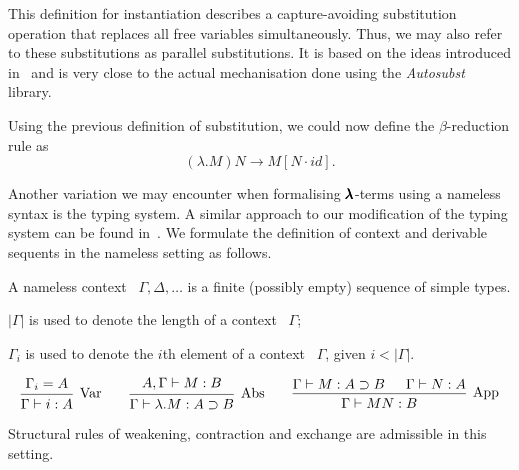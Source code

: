 This definition for instantiation describes a capture-avoiding substitution operation that replaces all free variables simultaneously.
Thus, we may also refer to these substitutions as parallel substitutions.
It is based on the ideas introduced in~\cite{AutosubstSchafer} and is very close to the actual mechanisation done using the \textit{Autosubst} library.

Using the previous definition of substitution, we could now define the $\beta$-reduction rule as
\[ (\lambda . M) N \to M[N \cdot id]. \]

Another variation we may encounter when formalising $\pmb{\lambda}$-terms using a nameless syntax is the typing system.
A similar approach to our modification of the typing system can be found in~\cite[Chapter~7]{AndrewAdams}.
We formulate the definition of context and derivable sequents in the nameless setting as follows.

\begin{definition}
  A nameless context \ $\Gamma, \Delta, \dots$ is a finite (possibly empty) sequence of simple types.
\end{definition}

\begin{notation} \hfill
  
  $| \Gamma |$ is used to denote the length of a context \ $\Gamma$;

  $\Gamma_i$ is used to denote the $i$th element of a context \ $\Gamma$, given $i < | \Gamma |$.
\end{notation}

\begin{definition}
  \label{nameless_typing_rules}
  \[
    \begin{prooftree}
      \hypo{ \Gamma_i = A }
      \infer1[Var]{ \Gamma \vdash i:A } 
    \end{prooftree}
    \qquad
    \begin{prooftree}
      \hypo{ A, \Gamma \vdash M:B }
      \infer1[Abs]{ \Gamma \vdash \lambda . M : A \supset B  } 
    \end{prooftree}
    \qquad
    \begin{prooftree}
      \hypo{ \Gamma \vdash M : A \supset B }
      \hypo{ \Gamma \vdash N : A }	
      \infer2[App]{ \Gamma \vdash M N : B } 
    \end{prooftree}
  \]
\end{definition}

\begin{claim}
  \label{nameless_typing_claim}  
  Structural rules of weakening, contraction and exchange are admissible in this setting.
\end{claim}

